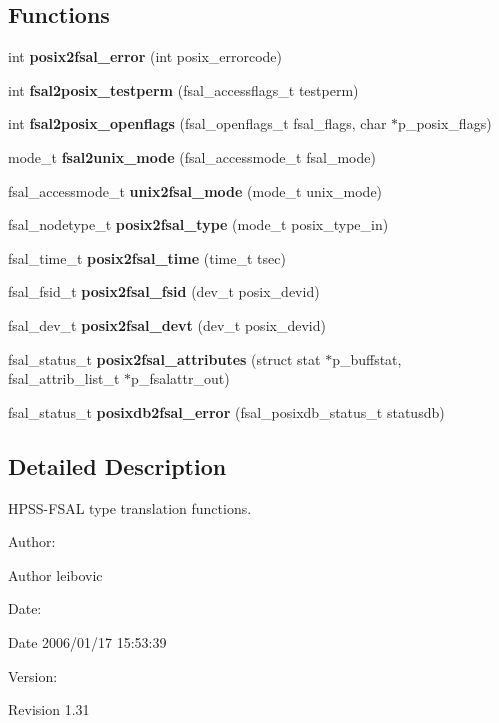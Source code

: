\subsection*{Functions}
\begin{CompactItemize}
\item 
int {\bf posix2fsal\_\-error} (int posix\_\-errorcode)
\item 
int {\bf fsal2posix\_\-testperm} (fsal\_\-accessflags\_\-t testperm)
\item 
int {\bf fsal2posix\_\-openflags} (fsal\_\-openflags\_\-t fsal\_\-flags, char $\ast$p\_\-posix\_\-flags)
\item 
mode\_\-t {\bf fsal2unix\_\-mode} (fsal\_\-accessmode\_\-t fsal\_\-mode)
\item 
fsal\_\-accessmode\_\-t {\bf unix2fsal\_\-mode} (mode\_\-t unix\_\-mode)
\item 
fsal\_\-nodetype\_\-t {\bf posix2fsal\_\-type} (mode\_\-t posix\_\-type\_\-in)
\item 
fsal\_\-time\_\-t {\bf posix2fsal\_\-time} (time\_\-t tsec)\label{fsal__convert_8c_a8}

\item 
fsal\_\-fsid\_\-t {\bf posix2fsal\_\-fsid} (dev\_\-t posix\_\-devid)\label{fsal__convert_8c_a9}

\item 
fsal\_\-dev\_\-t {\bf posix2fsal\_\-devt} (dev\_\-t posix\_\-devid)\label{fsal__convert_8c_a10}

\item 
fsal\_\-status\_\-t {\bf posix2fsal\_\-attributes} (struct stat $\ast$p\_\-buffstat, fsal\_\-attrib\_\-list\_\-t $\ast$p\_\-fsalattr\_\-out)\label{fsal__convert_8c_a11}

\item 
fsal\_\-status\_\-t {\bf posixdb2fsal\_\-error} (fsal\_\-posixdb\_\-status\_\-t statusdb)
\end{CompactItemize}


\subsection{Detailed Description}
HPSS-FSAL type translation functions. 

\begin{Desc}
\item[Author:]\begin{Desc}
\item[Author]leibovic \end{Desc}
\end{Desc}
\begin{Desc}
\item[Date:]\begin{Desc}
\item[Date]2006/01/17 15:53:39 \end{Desc}
\end{Desc}
\begin{Desc}
\item[Version:]\begin{Desc}
\item[Revision]1.31 \end{Desc}
\end{Desc}


